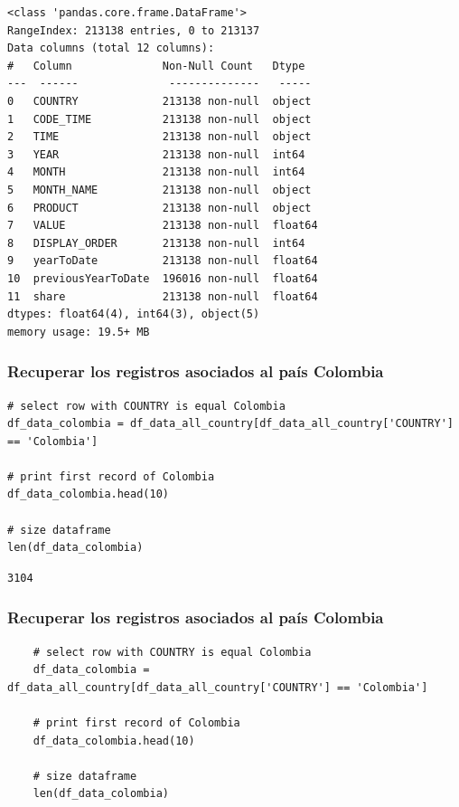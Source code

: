 \documentclass{article}
\begin{document}
\begin{verbatim}
<class 'pandas.core.frame.DataFrame'>
RangeIndex: 213138 entries, 0 to 213137
Data columns (total 12 columns):
#   Column              Non-Null Count   Dtype  
---  ------              --------------   -----  
0   COUNTRY             213138 non-null  object 
1   CODE_TIME           213138 non-null  object 
2   TIME                213138 non-null  object 
3   YEAR                213138 non-null  int64  
4   MONTH               213138 non-null  int64  
5   MONTH_NAME          213138 non-null  object 
6   PRODUCT             213138 non-null  object 
7   VALUE               213138 non-null  float64
8   DISPLAY_ORDER       213138 non-null  int64  
9   yearToDate          213138 non-null  float64
10  previousYearToDate  196016 non-null  float64
11  share               213138 non-null  float64
dtypes: float64(4), int64(3), object(5)
memory usage: 19.5+ MB
\end{verbatim}

\subsubsection{Recuperar los registros asociados al pa\'is Colombia}

\begin{verbatim}
# select row with COUNTRY is equal Colombia
df_data_colombia = df_data_all_country[df_data_all_country['COUNTRY'] == 'Colombia']

# print first record of Colombia
df_data_colombia.head(10)

# size dataframe
len(df_data_colombia)
\end{verbatim}

\begin{verbatim}
3104
\end{verbatim}


\subsubsection{Recuperar los registros asociados al pa\'is Colombia}

\begin{verbatim}
	# select row with COUNTRY is equal Colombia
	df_data_colombia = df_data_all_country[df_data_all_country['COUNTRY'] == 'Colombia']
	
	# print first record of Colombia
	df_data_colombia.head(10)
	
	# size dataframe
	len(df_data_colombia)
\end{verbatim}
\end{document}
